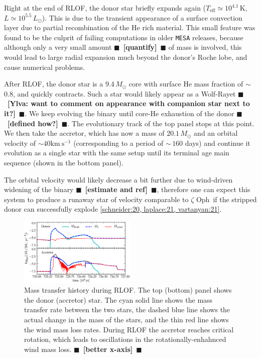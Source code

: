 \documentclass[twocolumn,twocolappendix,trackchanges]{aastex63}
\newcommand{\kms}{{\mathrm{km\ s^{-1}}}}
\newcommand{\zoph}{$\zeta$ Oph}
\newcommand{\todo}[1]{{\large $\blacksquare$~\textbf{\color{red}[#1]}}~$\blacksquare$}
\begin{document}
Right at the end of RLOF, the donor star briefly expands again
($T_\mathrm{eff}\simeq10^{4.1}$\,K, $L\simeq10^{5.5}\,L_\odot$). This
is due to the transient appearance of a surface convection layer due
to partial recombination of the He rich material. This small feature
was found to be the culprit of failing computations in older
\texttt{MESA} releases, because although only a very small amount
\todo{quantify} of mass is involved, this would lead to large radial
expansion much beyond the donor's Roche lobe, and cause numerical
problems.


After RLOF, the donor star is a 9.4$\,M_\odot$ core with surface He
mass fraction of $\sim$0.8, and quickly contracts. Such a star would
likely appear as a Wolf-Rayet \todo{Ylva: want to comment on
  appearance with companion star next to it?}. We keep evolving the
binary until core-He exhaustion of the donor \todo{defined how?}. The
evolutionary track of the top panel stops at this point.  We then take
the accretor, which has now a mass of $20.1\,M_\odot$ and an orbital
velocity of $\sim 40\kms$ (corresponding to a period of $\sim\,160$
days) and continue it evolution as a single star
with the same setup until its terminal age main sequence (shown in the
bottom panel).

The orbital velocity would likely decrease a bit further due to
wind-driven widening of the binary \todo{estimate and ref}, therefore
one can expect this system to produce a runaway star of velocity
comparable to \zoph\ if the stripped donor can successfully explode
\ref{schneider:20, laplace:21, vartanyan:21}.



\begin{figure}[htbp]
  \includegraphics[width=0.5\textwidth]{MT}
  \caption{Mass transfer history during RLOF. The top (bottom) panel
    shows the donor (accretor) star. The cyan solid line shows the
    mass transfer rate between the two stars, the dashed blue line
    shows the actual change in the mass of the stars, and the thin red
    line shows the wind mass loss rates. During RLOF the accretor
    reaches critical rotation, which leads to oscillations in the
    rotationally-enhahnced wind mass loss. \todo{better x-axis}}
  \label{fig:MT}
\end{figure}
\end{document}
